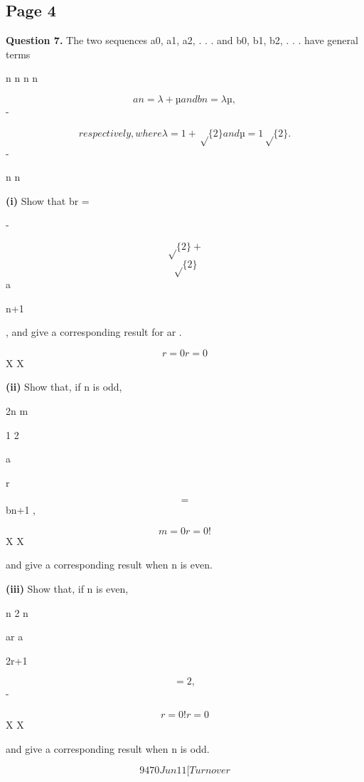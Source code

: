 \documentclass[12pt]{article}
\begin{document}
\subsection*{Page 4}
\begin{flushleft}
\bigskip\textbf{Question 7.} The two sequences a0, a1, a2, . . . and b0, b1, b2, . . . have general terms\par
n n n n\par
\[an = λ + µ and bn = λ µ ,\]
-\par
\[respectively, where λ = 1 + \sqrt\{2\} and µ = 1 \sqrt\{2\} .\]
-\par
n n\par
\textbf{(i)} Show that br =\par
-\par
\[\sqrt\{2\} +\]
\[\sqrt\{2\}\]
a\par
n+1\par
, and give a corresponding result for ar .\par
\[r=0 r=0\]
X X\par
\textbf{(ii)} Show that, if n is odd,\par
2n m\par
1 2\par
a\par
r\par
\[=\]
bn+1 ,\par
\[m=0 r=0 !\]
X X\par
and give a corresponding result when n is even.\par
\textbf{(iii)} Show that, if n is even,\par
n 2 n\par
ar a\par
2r+1\par
\[= 2 ,\]
-\par
\[r=0 ! r=0\]
X X\par
and give a corresponding result when n is odd.\par
\[9470 Jun11 [Turn over\]
\end{flushleft}
\end{document}
